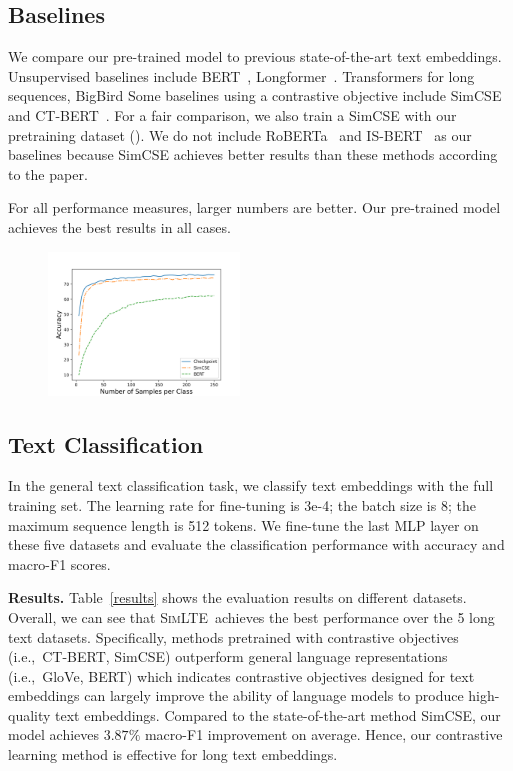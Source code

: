 \documentclass[11pt]{article}
\newcommand{\todo}[1]{{\color{red}{#1}}}
\newcommand{\our}{\mbox{\textsc{SimLTE}}}
\begin{document}
\subsection{Baselines}
We compare our pre-trained model to previous state-of-the-art text embeddings. 
Unsupervised baselines include BERT~\cite{Devlin2019BERTPO}, Longformer~\cite{Beltagy2020LongformerTL}. 
Transformers for long sequences, BigBird\cite{Zaheer2020BigBT}
Some baselines using a contrastive objective include SimCSE~\cite{Gao2021SimCSESC} and CT-BERT~\cite{Carlsson2021SemanticRW}. 
For a fair comparison, we also train a SimCSE with our pretraining dataset (\todo{SimCSE$_\mathrm{long}$}). 
We do not include RoBERTa~\cite{Liu2019RoBERTaAR} and IS-BERT~\cite{Zhang2020AnUS} as our baselines because SimCSE achieves better results than these methods according to the paper.

\begin{table}
    \centering
    
    \caption{For all performance measures, larger numbers are better. Our pre-trained model achieves the best results in all cases.}
    \label{results}
\end{table}

\begin{figure}
\includegraphics[width=\columnwidth,height=1.5in]{fig/few_shot.png}
\caption{
}  
\label{few_shot}
\end{figure}

\subsection{Text Classification}
In the general text classification task, we classify text embeddings with the full training set. 
The learning rate for fine-tuning is 3e-4; the batch size is 8; the maximum sequence length is 512 tokens. 
We fine-tune the last MLP layer on these five datasets and evaluate the classification performance with accuracy and macro-F1 scores.

\textbf{Results.}
Table~\ref{results} shows the evaluation results on different datasets. 
Overall, we can see that \our~achieves the best performance over the 5 long text datasets. 
Specifically, methods pretrained with contrastive objectives (i.e.,~CT-BERT, SimCSE) outperform general language representations (i.e.,~GloVe, BERT) which indicates contrastive objectives designed for text embeddings can largely improve the ability of language models to produce high-quality text embeddings. 
Compared to the state-of-the-art method SimCSE, our model achieves $3.87\%$ macro-F1 improvement on average. Hence, our contrastive learning method is effective for long text embeddings.
\end{document}
